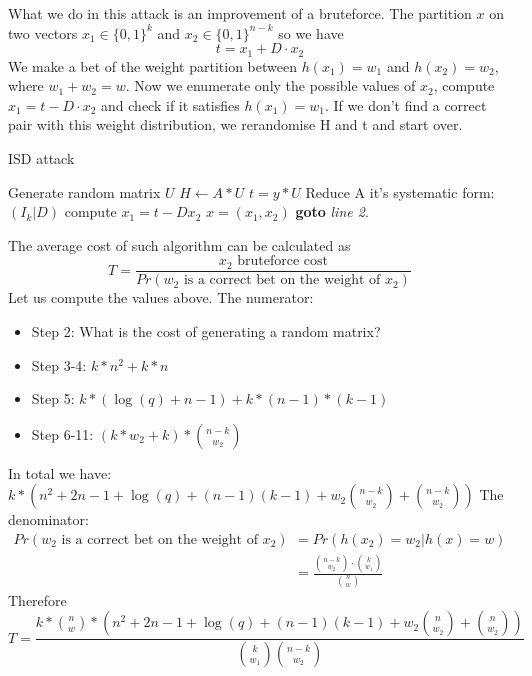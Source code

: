 \documentclass[12pt]{article}
\begin{document}
What we do in this attack is an improvement of a bruteforce. The partition $x$ on two vectors $x_1 \in \{0,1\}^{k}$ and  $x_2  \in \{0,1\}^{n-k}$ so we have
\[
t = x_1 + D \cdot x_2
\]
We make a bet of the weight partition between $h(x_1) = w_1$ and $h(x_2) = w_2$, where $w_1 + w_2 = w$. Now we enumerate only the possible values of $x_2$, compute $x_1 = t - D \cdot x_2$ and check if it satisfies $h(x_1) = w_1$. If we don't find a correct pair with this weight distribution, we rerandomise H and t and start over.
\begin{algorithm}
\caption{ISD attack}\label{ISD}
\begin{algorithmic}[1]
    \State Generate random matrix $U$
    \State $H \gets A * U$
    \State $t = y * U$
    \State Reduce A it's systematic form: $(I_k |D)$
        \State compute $x_1 = t - Dx_2$
        \State \Return $x = (x_1, x_2)$
        \EndIf
    \EndFor
\State \textbf{goto} \emph{line 2}.
\EndProcedure
\end{algorithmic}
\end{algorithm}
The average cost of such algorithm can be calculated as
\[
T = \frac{x_2\text{ bruteforce cost}}{Pr(w_2\text{ is a correct bet on the weight of }x_2)}
\]
Let us compute the values above.
The numerator:
\begin{itemize}
    \item Step 2: What is the cost of generating a random matrix?
    \item Step 3-4: $k*n^2 + k*n$
    \item Step 5: $k*(\log(q) + n-1) + k*(n-1)*(k-1)$
    \item Step 6-11: $(k*w_2 + k)*\binom{n-k}{w_2}$
\end{itemize}
In total we have: $k*(n^2 + 2n - 1 + \log(q) + (n-1)(k-1) + w_2\binom{n-k}{w_2} + \binom{n-k}{w_2})$
The denominator:
\[
\begin{split}
    Pr(w_2\text{ is a correct bet on the weight of }x_2) & = Pr(h(x_2) = w_2|h(x) = w) \\
    & = \frac{\binom{n-k}{w_2} \cdot \binom{k}{w_1}}{\binom{n}{w}}
\end{split}
\]
Therefore
\[
T = \frac{k*\binom{n}{w}*(n^2 + 2n - 1 + \log(q) + (n-1)(k-1) + w_2\binom{n}{w_2} + \binom{n}{w_2})}{\binom{k}{w_1}\binom{n-k}{w_2}}
\]
\end{document}
